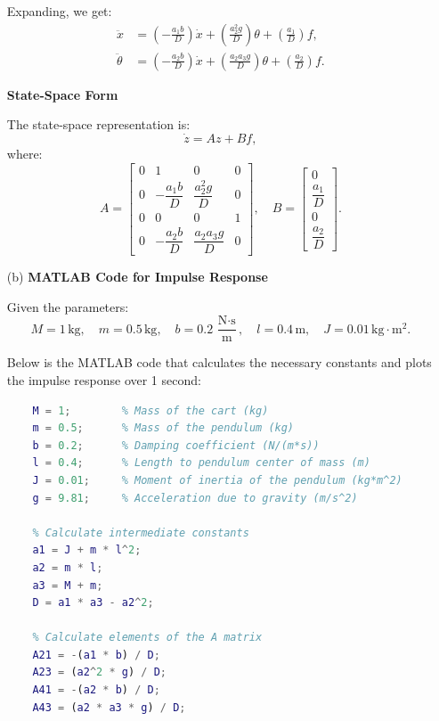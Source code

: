 \documentclass[12pt]{article}
\begin{document}
\begin{enumerate}
    Expanding, we get:
    \begin{align*}
    \ddot{x} &= \left( -\frac{a_1 b}{D} \right) \dot{x} + \left( \frac{a_2^2 g}{D} \right) \theta + \left( \frac{a_1}{D} \right) f, \\
    \ddot{\theta} &= \left( -\frac{a_2 b}{D} \right) \dot{x} + \left( \frac{a_2 a_3 g}{D} \right) \theta + \left( \frac{a_2}{D} \right) f.
    \end{align*}

    \textbf{State-Space Form}

    The state-space representation is:
    \[
    \dot{z} = A z + B f,
    \]
    where:
    \[
    A =
    \begin{bmatrix}
    0 & 1 & 0 & 0 \\
    0 & -\dfrac{a_1 b}{D} & \dfrac{a_2^2 g}{D} & 0 \\
    0 & 0 & 0 & 1 \\
    0 & -\dfrac{a_2 b}{D} & \dfrac{a_2 a_3 g}{D} & 0
    \end{bmatrix}, \quad
    B =
    \begin{bmatrix}
    0 \\
    \dfrac{a_1}{D} \\
    0 \\
    \dfrac{a_2}{D}
    \end{bmatrix}.
    \]

    \item[(b)] \textbf{MATLAB Code for Impulse Response}

    Given the parameters:
    \[
    M = 1\, \text{kg}, \quad m = 0.5\, \text{kg}, \quad b = 0.2\, \frac{\text{N}\cdot\text{s}}{\text{m}}, \quad l = 0.4\, \text{m}, \quad J = 0.01\, \text{kg}\cdot\text{m}^2.
    \]

    Below is the MATLAB code that calculates the necessary constants and plots the impulse response over 1 second:

    \begin{lstlisting}[language=Matlab]
    % Define the given parameters
    M = 1;        % Mass of the cart (kg)
    m = 0.5;      % Mass of the pendulum (kg)
    b = 0.2;      % Damping coefficient (N/(m*s))
    l = 0.4;      % Length to pendulum center of mass (m)
    J = 0.01;     % Moment of inertia of the pendulum (kg*m^2)
    g = 9.81;     % Acceleration due to gravity (m/s^2)

    % Calculate intermediate constants
    a1 = J + m * l^2;
    a2 = m * l;
    a3 = M + m;
    D = a1 * a3 - a2^2;

    % Calculate elements of the A matrix
    A21 = -(a1 * b) / D;
    A23 = (a2^2 * g) / D;
    A41 = -(a2 * b) / D;
    A43 = (a2 * a3 * g) / D;


\end{lstlisting}
\end{enumerate}
\end{document}
